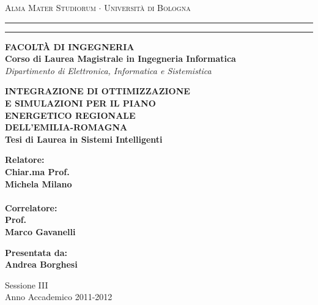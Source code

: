 \documentclass[12pt,a4paper]{report}
\begin{document}
\begin{titlepage}
\begin{center}
{{\Large{\textsc{Alma Mater Studiorum $\cdot$ Universit\`a di
Bologna}}}} \rule[0.1cm]{15.8cm}{0.1mm}
\rule[0.5cm]{15.8cm}{0.6mm}
{\small{\bf FACOLT\`A DI INGEGNERIA\\
Corso di Laurea Magistrale in Ingegneria Informatica\\}}
{{\em Dipartimento di Elettronica, Informatica e Sistemistica}}
\end{center}
\vspace{15mm}
\begin{center}
{\LARGE{\bf INTEGRAZIONE DI OTTIMIZZAZIONE}}\\
\vspace{2mm}
{\LARGE{\bf E SIMULAZIONI PER IL PIANO}}\\
\vspace{2mm}
{\LARGE{\bf ENERGETICO REGIONALE}}\\
\vspace{2mm}
{\LARGE{\bf DELL'EMILIA-ROMAGNA}}\\
\vspace{10mm} {\large{\bf Tesi di Laurea in Sistemi Intelligenti}}
\end{center}
\vspace{35mm}
\par
\noindent
\begin{minipage}[t]{0.47\textwidth}
{\large{\bf Relatore:\\
Chiar.ma Prof.\\
Michela Milano\\ \\

Correlatore:\\
Prof.\\
Marco Gavanelli}}
\end{minipage}
\hfill
\begin{minipage}[t]{0.47\textwidth}\raggedleft
{\large{\bf Presentata da:\\
Andrea Borghesi}}
\end{minipage}
\vspace{20mm}
\begin{center}
{\large{ Sessione III\\%
Anno Accademico 2011-2012}}%
\end{center}
\end{titlepage}
\end{document}
